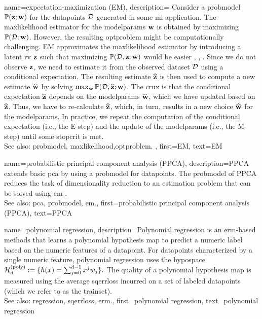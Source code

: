 {name={expectation-maximization (EM)}, 
 description={ 
		Consider a \gls{probmodel} $\mathbb{P}({{\bf z}; {\bf w}})$ for the \glspl{datapoint} $\mathcal{D}$ 
		generated in some \gls{ml} application. The \gls{maxlikelihood} estimator for the \gls{modelparams} 
		${\bf w}$ is obtained by maximizing $\mathbb{P}({\mathcal{D}; {\bf w}})$. However, the resulting 
		\gls{optproblem} might be computationally challenging. EM approximates the \gls{maxlikelihood} 
		estimator by introducing a latent \gls{rv} ${\bf z}$ such that maximizing $\mathbb{P}({\mathcal{D},{\bf z}; {\bf w}})$ 
		would be easier \cite{hastie01statisticallearning}, \cite{BishopBook}, \cite{GraphModExpFamVarInfWainJor}. 
		Since we do not observe ${\bf z}$, we need to estimate it from the observed \gls{dataset} $\mathcal{D}$ 
		using a conditional \gls{expectation}. The resulting estimate $\widehat{{\bf z}}$ is then used to 
		compute a new estimate $\widehat{{\bf w}}$ by solving $\max_{{\bf w}} \mathbb{P}({\mathcal{D}, \widehat{{\bf z}}; {\bf w}})$. 
		The crux is that the conditional \gls{expectation} $\widehat{{\bf z}}$ depends on the \gls{modelparams} $\widehat{{\bf w}}$, 
		which we have updated based on $\widehat{{\bf z}}$. Thus, we have to re-calculate $\widehat{{\bf z}}$, 
		which, in turn, results in a new choice $\widehat{{\bf w}}$ for the \gls{modelparams}. In practice, 
		we repeat the computation of the conditional \gls{expectation} (i.e., the E-step) and the update 
		of the \gls{modelparams} (i.e., the M-step) until some \gls{stopcrit} is met. 
				\\
		See also: \gls{probmodel}, \gls{maxlikelihood},\gls{optproblem}.
  	},
	first={EM},
	text={EM}
}

{name={probabilistic principal component analysis (PPCA)}, 
 description={PPCA 
		extends basic \gls{pca} by using a \gls{probmodel} for \glspl{datapoint}. 
		The \gls{probmodel} of PPCA reduces the task of dimensionality reduction 
		to an estimation problem that can be solved using \gls{em} \cite{TippingProbPCA}.
				\\
		See also: \gls{pca}, \gls{probmodel}, \gls{em}.},
		first={probabilistic principal component analysis (PPCA)},
		text={PPCA}
}
	
{name={polynomial regression}, 
	description={Polynomial 
		\gls{regression} is an \gls{erm}-based methods that learns a polynomial \gls{hypothesis} 
		\gls{map} to predict a numeric \gls{label} based on the numeric \glspl{feature} of a \gls{datapoint}. 
		For \glspl{datapoint} characterized by a single numeric \gls{feature}, polynomial \gls{regression} 
		uses the \gls{hypospace} 
		$\mathcal{H}^{(\rm poly)}_{d} := \{ h(x) = \sum_{j=0}^{d-1} x^{j} w_{j} \}.$
			The quality of a polynomial \gls{hypothesis} \gls{map} is measured using the average \gls{sqerrloss} 
			incurred on a set of \glspl{labeled datapoint} (which we refer to as the 
			\gls{trainset}).
					\\
		See also: \gls{regression}, \gls{sqerrloss}, \gls{erm}.},
		first={polynomial regression},
		text={polynomial regression}
}

